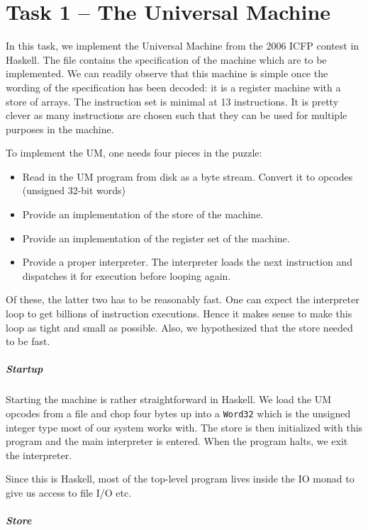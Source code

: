 \chapter*{Task 1 -- The Universal Machine}
\label{chap:task+1}

In this task, we implement the Universal Machine from the 2006 ICFP
contest in Haskell. The file \cite{um+spec} contains the specification
of the machine which are to be implemented. We can readily observe
that this machine is simple once the wording of the specification has
been decoded: it is a register machine with a store of
arrays. The instruction set is minimal at 13 instructions. It is pretty
clever as many instructions are chosen such that they can be used for
multiple purposes in the machine.

To implement the UM, one needs four pieces in the puzzle:
\begin{itemize}
\item Read in the UM program from disk as a byte stream. Convert it to
  opcodes (unsigned 32-bit words)
\item Provide an implementation of the store of the machine.
\item Provide an implementation of the register set of the machine.
\item Provide a proper interpreter. The interpreter loads the next
  instruction and dispatches it for execution before looping again.
\end{itemize}
Of these, the latter two has to be reasonably fast. One can expect the
interpreter loop to get billions of instruction executions. Hence it
makes sense to make this loop as tight and small as possible. Also, we
hypothesized that the store needed to be fast.

\paragraph{Startup}
\label{sec:startup}

Starting the machine is rather straightforward in Haskell. We load the
UM opcodes from a file and chop four bytes up into a \texttt{Word32}
which is the unsigned integer type most of our system works with. The
store is then initialized with this program and the main interpreter
is entered. When the program halts, we exit the interpreter.

Since this is Haskell, most of the top-level program lives inside the
IO monad to give us access to file I/O etc.

\paragraph{Store}
\label{sec:store}

